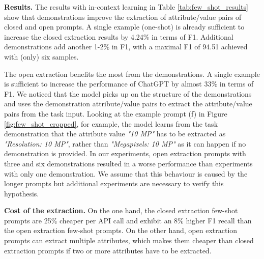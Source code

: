 \vspace{.2cm}\noindent\textbf{Results.}
The results with in-context learning in Table \ref{tab:few_shot_results} show that demonstrations improve the extraction of attribute/value pairs of closed and open prompts. A single example (one-shot) is already sufficient to increase the closed extraction results by 4.24\% in terms of F1. Additional demonstrations add another 1-2\% in F1, with a maximal F1 of 94.51 achieved with (only) six samples.

The open extraction benefits the most from the demonstrations. A single example is sufficient to increase the performance of ChatGPT by almost 33\% in terms of F1. We noticed that the model picks up on the structure of the demonstrations and uses the demonstration attribute/value pairs to extract the attribute/value pairs from the task input. Looking at the example prompt (f) in Figure \ref{fig:few_shot_cropped}, for example, the model learns from the task demonstration that the attribute value \emph{"10 MP"} has to be extracted as \emph{"Resolution: 10 MP"}, rather than \emph{"Megapixels: 10 MP"} as it can happen if no demonstration is provided.
In our experiments, open extraction prompts with three and six demonstrations resulted in a worse performance than experiments with only one demonstration. We assume that this behaviour is caused by the longer prompts but additional experiments are necessary to verify this hypothesis.

\vspace{.2cm}\noindent\textbf{Cost of the extraction.}
On the one hand, the closed extraction few-shot prompts are 25\% cheaper per API call and exhibit an 8\% higher F1 recall than the open extraction few-shot prompts. On the other hand, open extraction prompts can extract multiple attributes, which makes them cheaper than closed extraction prompts if two or more attributes have to be extracted. 

